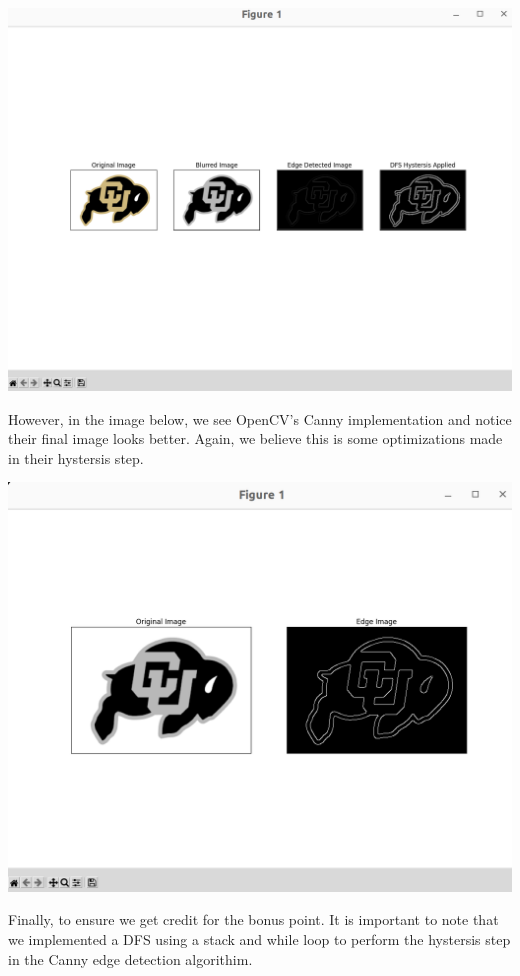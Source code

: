 \documentclass{article}
\numberwithin{equation}{section} %
\numberwithin{figure}{section} %
\numberwithin{table}{section} %
\begin{document}
\begin{framed}
\begin{center}
\includegraphics[scale=.25]{ourCanny.png}
\end{center}

However, in the image below, we see OpenCV's Canny implementation and notice their final image looks better.  Again, we believe this is some optimizations made in their hystersis step.

\begin{center}
\includegraphics[scale=.25]{thierCanny.png}
\end{center}

Finally, to ensure we get credit for the bonus point.  It is important to note that we implemented a DFS using a stack and while loop to perform the hystersis step in the Canny edge detection algorithim.

\end{framed}
\end{document}
